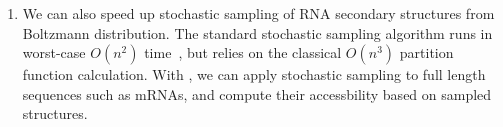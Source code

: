 \begin{enumerate}
\item 
We can also speed up stochastic sampling of RNA secondary structures from Boltzmann distribution.
The standard stochastic sampling algorithm runs in worst-case $O(n^2)$ time~\cite{Ding+Lawrence:2003},
but relies on the classical $O(n^3)$ partition function calculation.
With \linearpartition, 
we can apply stochastic sampling to full length sequences such as mRNAs, 
and compute their accessbility based on sampled structures.

\end{enumerate}


